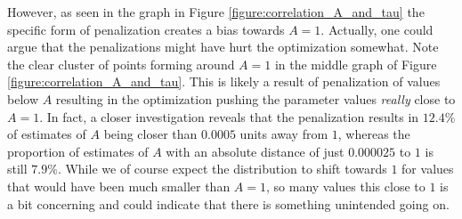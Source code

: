 However, as seen in the graph in Figure \ref{figure:correlation_A_and_tau} the specific form of penalization creates a bias towards $A = 1$. Actually, one could argue that the penalizations might have hurt the optimization somewhat. Note the clear cluster of points forming around $A = 1$ in the middle graph of Figure \ref{figure:correlation_A_and_tau}. This is likely a result of penalization of values below $A$ resulting in the optimization pushing the parameter values \textit{really} close to $A = 1$. In fact, a closer investigation reveals that the penalization results in $12.4\%$ of estimates of $A$ being closer than $0.0005$ units away from $1$, whereas the proportion of estimates of $A$ with an absolute distance of just $0.000025$ to $1$ is still $7.9\%$. While we of course expect the distribution to shift towards $1$ for values that would have been much smaller than $A = 1$, so many values this close to $1$ is a bit concerning and could indicate that there is something unintended going on.

